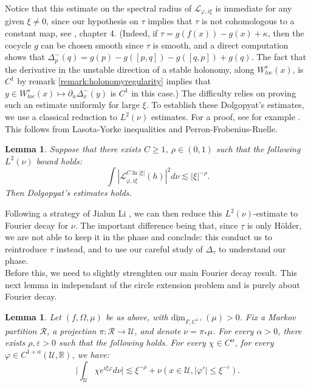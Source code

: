 \documentclass[a4paper]{article}
\newtheorem{lemma}[theorem]{Lemma}
\theoremstyle{definition}
\begin{document}
Notice that this estimate on the spectral radius of $\mathcal{L}_{\varphi,i\xi}$ is immediate for any given $\xi \neq 0$, since our hypothesis on $\tau$ implies that $\tau$ is not cohomologous to a constant map, see \cite{PP90}, chapter 4. (Indeed, if $\tau = g(f(x))-g(x)+\kappa$, then the cocycle $g$ can be chosen smooth since $\tau$ is smooth, and a direct computation shows that $\Delta^-_p(q) = g(p) - g([p,q]) - g([q,p])+g(q)$. The fact that the derivative in the unstable direction of a stable holonomy, along $W^{s}_{loc}(x)$, is $C^1$ by remark \ref{remark:holonomyregularity} implies that  $y \in W^s_{loc}(x) \mapsto \partial_u\Delta^-_x(y)$ is $C^1$ in this case.) The difficulty relies on proving such an estimate uniformly for large $\xi$. To establish these Dolgopyat's estimates, we use a classical reduction to $L^2(\nu)$ estimates. For a proof, see for example \cite{Do98,Na05}. This follows from Lasota-Yorke inequalities and Perron-Frobenius-Ruelle.

\begin{lemma}\label{lem:Edoll2}
Suppose that there exists $C \geq 1$, $\rho \in (0,1)$ such that the following $L^2(\nu)$ bound holds:
$$ \int |\mathcal{L}_{\varphi,i \xi}^{C \ln |\xi|} (h)|^2 d\nu \lesssim |\xi|^{-\rho} .$$
Then Dolgopyat's estimates holds.
\end{lemma}

Following a strategy of Jialun Li \cite{Li20}, we can then reduce this $L^2(\nu)$-estimate to Fourier decay for $\nu$. The important difference being that, since $\underline{\tau}$ is only Hölder, we are not able to keep it in the phase and conclude: this conduct us to reintroduce $\tau$ instead, and to use our careful study of $\Delta_\tau$ to understand our phase. \\
Before this, we need to slightly strenghten our main Fourier decay result. This next lemma in independant of the circle extension problem and is purely about Fourier decay.

\begin{lemma}{}
Let $(f,\Omega,\mu)$ be as above, with $\underline{\text{dim}}_{F,C^{1+}}(\mu)>0$. Fix a Markov partition $\mathcal{R}$, a projection $\pi:\mathcal{R} \rightarrow \mathcal{U}$, and denote $\nu = \pi_* \mu$. For every $\alpha>0$, there exists $\rho,\varepsilon>0$ such that the following holds. 
For every $\chi \in C^\alpha$, for every $\varphi \in C^{1+\alpha}(\mathcal{U},\mathbb{R})$, we have: $$ \Big|\int_\mathcal{U} \chi e^{i \xi \varphi} d\nu\Big| \lesssim \xi^{-\rho} + \nu(x \in \mathcal{U}, |\varphi'|\leq \xi^{-\varepsilon}). $$
\end{lemma}
\end{document}
